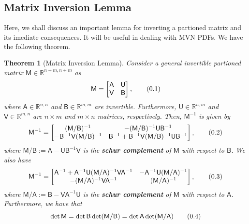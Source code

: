 \documentclass[10pt]{article}
\newtheorem{thm}{Theorem}[section]
\theoremstyle{definition}
\newcommand\eqnum{\addtocounter{equation}{1}\tag{\arabic{section}.\arabic{equation}}}
\begin{document}
\subsection{Matrix Inversion Lemma}
Here, we shall discuss an important lemma for inverting a partioned matrix and its imediate consequences. It will be useful in dealing with MVN PDFs. We have the following theorem.
\begin{thm}[Matrix Inversion Lemma]\label{thm:MIL}
Consider a general invertible partioned matrix $\mathsf{M}\in\mathbb{R}^{n+m,n+m}$ as
\begin{equation*}
\mathsf{M} =
\begin{bmatrix}
\mathsf{A} & \mathsf{U} \\
\mathsf{V} & \mathsf{B}
\end{bmatrix},
\eqnum
\end{equation*}
where $\mathsf{A}\in\mathbb{R}^{n,n}$ and $\mathsf{B}\in\mathbb{R}^{m,m}$ are invertible. Furthermore, $\mathsf{U}\in\mathbb{R}^{n,m}$ and $\mathsf{V}\in\mathbb{R}^{m,n}$ are $n \times m$ and $m\times n$ matrices, respectively. Then, $\mathsf{M}^{-1}$ is given by
\begin{equation*}
\mathsf{M}^{-1} =
\begin{bmatrix}
(\mathsf{M}/\mathsf{B})^{-1} & 
-(\mathsf{M}/\mathsf{B})^{-1}\mathsf{U}\mathsf{B}^{-1} \\
-\mathsf{B}^{-1}\mathsf{V}(\mathsf{M}/\mathsf{B})^{-1} & 
\mathsf{B}^{-1}+\mathsf{B}^{-1}\mathsf{V}(\mathsf{M}/\mathsf{B})^{-1}\mathsf{U}\mathsf{B}^{-1}
\end{bmatrix},
\eqnum
\label{eq:schur:MB}
\end{equation*}
where $\mathsf{M}/\mathsf{B}:=\mathsf{A}-\mathsf{U}\mathsf{B}^{-1}\mathsf{V}$ is the \textbf{schur complement} of $\mathsf{M}$ with respect to $\mathsf{B}$. We also have
\begin{equation*}
\mathsf{M}^{-1} =
\begin{bmatrix}
\mathsf{A}^{-1}+\mathsf{A}^{-1}\mathsf{U}(\mathsf{M}/\mathsf{A})^{-1}\mathsf{V}\mathsf{A}^{-1} & 
-\mathsf{A}^{-1}\mathsf{U} (\mathsf{M}/\mathsf{A})^{-1} \\
-(\mathsf{M}/\mathsf{A})^{-1}\mathsf{V}\mathsf{A}^{-1} & 
(\mathsf{M}/\mathsf{A})^{-1} 
\end{bmatrix},
\eqnum
\label{eq:schur:MA}
\end{equation*}
where $\mathsf{M}/\mathsf{A}:=\mathsf{B}-\mathsf{V}\mathsf{A}^{-1}\mathsf{U}$ is the \textbf{schur complement} of $\mathsf{M}$ with respect to $\mathsf{A}$. Furthermore, we have that
\begin{equation*}
\det\mathsf{M} = \det\mathsf{B}\det(\mathsf{M}/\mathsf{B})= \det\mathsf{A}\det(\mathsf{M}/\mathsf{A})
\eqnum
\label{eq:schur:det}
\end{equation*}
\end{thm}
\end{document}

